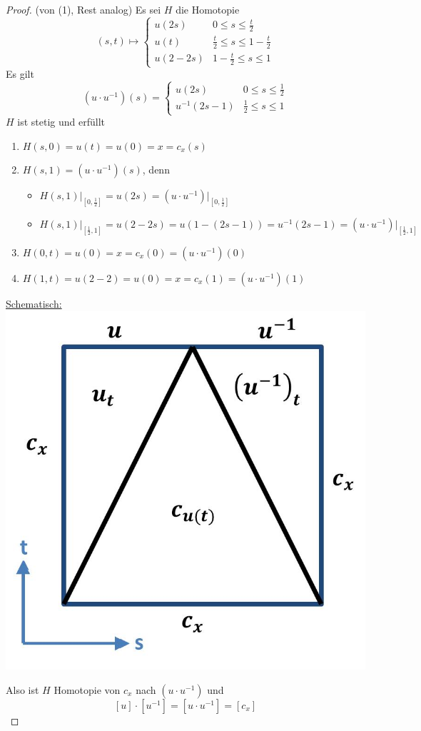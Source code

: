 \documentclass[a4paper,11pt,notitlepage]{report}
\theoremstyle{remark}
\theoremstyle{definition}
\begin{document}
\begin{proof} (von (1), Rest analog)
\newline
Es sei $H$ die Homotopie 
$$(s,t) \mapsto \begin{cases} u(2s) & 0 \leq s \leq \frac{t}{2} \\ u(t) & \frac{t}{2} \leq s \leq 1- \frac{t}{2} \\ u(2-2s) & 1-\frac{t}{2} \leq s \leq 1 \end{cases}$$
Es gilt 
$$(u \cdot u^{-1})(s) = \begin{cases} u(2s) & 0 \leq s \leq \frac{1}{2} \\ u^{-1}(2s-1) & \frac{1}{2} \leq s \leq 1 \end{cases}$$
$H$ ist stetig und erfüllt
\begin{enumerate}
	\item $H(s,0) = u(t) = u(0) = x = c_x(s)$
	\item $H(s,1) = (u \cdot u^{-1})(s)$, denn
	\begin{itemize}
		\item $H(s,1) \big |_{[0, \frac{1}{2}]} = u(2s) = (u \cdot u^{-1}) \big |_{[0, \frac{1}{2}]}$
		\item $H(s,1) \big |_{[\frac{1}{2},1]} = u(2-2s) = u(1-(2s-1)) = u^{-1}(2s-1) = (u \cdot u^{-1}) \big |_{[\frac{1}{2},1]}$  
	\end{itemize}
	\item $H(0,t) = u(0) = x = c_x(0) = (u \cdot u^{-1})(0)$
	\item $H(1,t) = u(2-2) = u(0) = x = c_x(1) = (u \cdot u^{-1})(1)$
\end{enumerate}

\underline{Schematisch:} \includegraphics[scale=0.4]{images/Beweis_Produkt_Lemma.jpg}

Also ist $H$ Homotopie von $c_x$ nach $(u \cdot u^{-1})$ und $$[u] \cdot [u^{-1}] = [u \cdot u^{-1}] = [c_x]$$
\end{proof}
\end{document}
